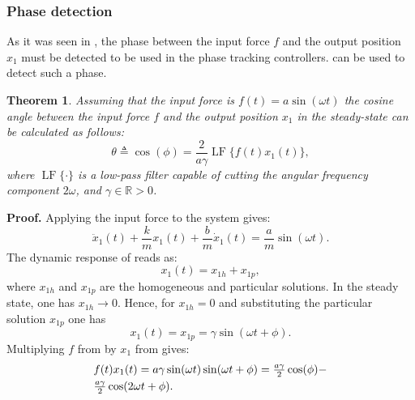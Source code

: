 \documentclass[lettersize,journal]{IEEEtran}
\DeclareMathOperator{\LF}{LF}
\newtheorem{theorem}{Theorem}
\begin{document}
\subsubsection{Phase detection} \label{S_phase_detection}

As it was seen in , the phase between the input force $f$ and the output position $x_1$ must be detected to be used in the phase tracking controllers.  can be used to detect such a phase.
\begin{theorem} \label{Lemma_phase_detection}
Assuming that the input force is $f(t)=a\sin(\omega t)$ the cosine angle between the input force $f$ and the output position $x_1$ in the steady-state can be calculated as follows:
\begin{equation}
\theta\triangleq \cos(\phi) = \frac{2} {a\gamma}\LF \{f(t)x_1(t) \} ,
\label{E_phase_calculated}
\end{equation}
where $\LF\{\cdot\}$ is a low-pass filter capable of cutting the angular frequency component $2\omega$, and $\gamma \in \mathbb{R}>0$.
\end{theorem}
\noindent \textbf{Proof.}
Applying the input force  to the system  gives:
\begin{equation}
\ddot{x}_1(t)+\frac{k}{m}x_1(t)+\frac{b}{m} \dot{x}_1(t) =\frac{a}{m}\sin(\omega t) .
\label{E_plant_closed_loop}
\end{equation}
The dynamic response of  reads as:
\begin{equation}
x_1(t)=x_{1h}+x_{1p},
\end{equation}
where $x_{1h}$ and $x_{1p}$ are the homogeneous and particular solutions. In the steady state, one has $x_{1h} \rightarrow 0$. Hence, for $x_{1h}=0$ and substituting the particular solution $x_{1p}$ one has 
\begin{equation}
x_1(t)=x_{1p}=\gamma\sin(\omega t+\phi).
\label{E_x_1_steady}
\end{equation}
Multiplying $f$ from  by $x_1$ from  gives:
\begin{equation}
\begin{array}{l}
f(t)x_1(t)=a\gamma\sin(\omega t)\sin(\omega t+\phi)=\frac{a\gamma}{2}\cos(\phi)- \vspace{0.1cm} \\ 
\frac{a\gamma}{2}\cos(2\omega t +\phi) .
\end{array}
\label{E_multiple_avant}
\end{equation}
\end{document}
